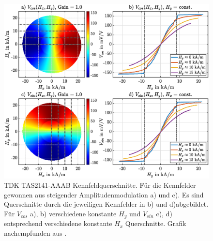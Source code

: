 	
	\clearpage
	\begin{figure}[tbph]
		\centering
		\includegraphics[width=\linewidth]{chapters/images/TDK_Kennfeld_Steigend}
		\caption[TDK TAS2141-AAAB Kennfeldquerschnitte]{TDK TAS2141-AAAB Kennfeldquerschnitte. Für die Kennfelder 
		gewonnen aus steigender Amplitudenmodulation a) und c). Es sind Querschnitte durch die jeweiligen Kennfelder in 
		b) und d)abgebildet. Für $V_{cos}$ a), b) verschiedene konstante $H_y$ und $V_{sin}$ c), d) entsprechend 
		verschiedene konstante $H_x$ Querschnitte. Grafik nachempfunden aus \cite{Schuethe2019}.}
		\label{fig:tdkkennfeldsteigend}
	\end{figure}
	
